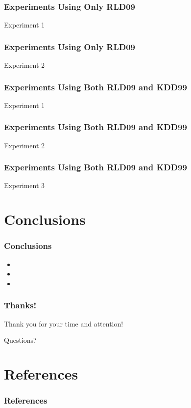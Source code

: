 \documentclass{beamer}
\newcommand{\linespace}{\vskip 0.25cm}
\begin{document}
\begin{frame}
	\frametitle{Experiments Using Only RLD09}
Experiment 1
\end{frame}


\begin{frame}
	\frametitle{Experiments Using Only RLD09}
Experiment 2
	
\end{frame}


\begin{frame}
	\frametitle{Experiments Using Both RLD09 and KDD99}
Experiment 1
	
\end{frame}


\begin{frame}
	\frametitle{Experiments Using Both RLD09 and KDD99}
Experiment 2
	
\end{frame}


\begin{frame}
	\frametitle{Experiments Using Both RLD09 and KDD99}
Experiment 3
	
\end{frame}
\section[Conclusions]{Conclusions}

\begin{frame}
\frametitle{Conclusions}

\begin{itemize}
  \item 
  
  \linespace
  
  \item 

  \linespace
  
  \item
\end{itemize}


\end{frame}

\begin{frame}
	\frametitle{Thanks!}
	
	Thank you for your time and attention!
		
	\linespace
	\linespace
	
	\begin{center}
	{\huge Questions?}
	\end{center}
\end{frame}

\section*{References}

\begin{frame} 
	\frametitle{References} 
	
	\begin{thebibliography}{lskdjf}
	
  	\end{thebibliography}
	
\end{frame} 
\end{document}
